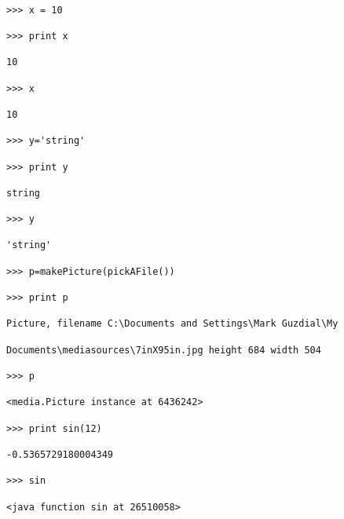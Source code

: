 \begin{verbatim}

>>> x = 10

>>> print x

10

>>> x

10

>>> y='string'

>>> print y

string

>>> y

'string'

>>> p=makePicture(pickAFile())

>>> print p

Picture, filename C:\Documents and Settings\Mark Guzdial\My

Documents\mediasources\7inX95in.jpg height 684 width 504

>>> p

<media.Picture instance at 6436242>

>>> print sin(12)

-0.5365729180004349

>>> sin

<java function sin at 26510058>

\end{verbatim}

